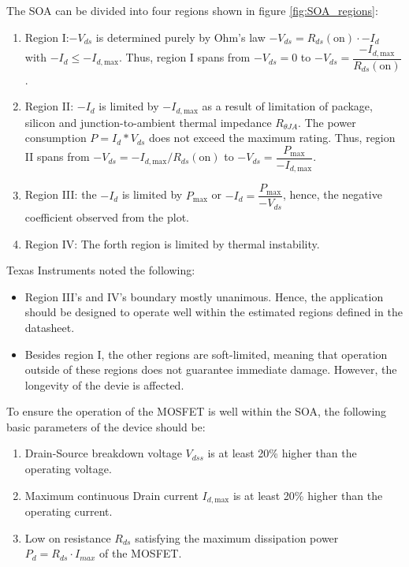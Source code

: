 \documentclass[../main.tex]{subfiles}
\begin{document}
    \justify
    The SOA can be divided into four regions shown in figure \ref{fig:SOA_regions}:
    \begin{enumerate}
        \item Region I:$-V_{ds}$ is determined purely by Ohm's law  $-V_{ds} = R_{ds}(\text{on})\cdot -I_d$ with $-I_d \leq -I_{d,\text{max}}$. Thus, region I spans from $-V_{ds} = 0$ to $-V_{ds} = \dfrac{-I_{d,\text{max}}}{R_{ds}(\text{on})}$.
        \item Region II: $-I_{d}$ is limited by $-I_{d,\text{max}}$ as a result of limitation of package, silicon and junction-to-ambient thermal impedance $R_{\theta J A}$. The power consumption $P=I_{d} * V_{ds}$ does not exceed the maximum rating. Thus, region II spans from $-V_{ds} = -I_{d,\text{max}} / R_{ds}(\text{on})$ to $-V_{ds} = \dfrac{P_\text{max}}{-I_{d,\text{max}}}$.
        \item Region III: the $-I_{d}$ is limited by $P_\text{max}$ or $-I_d = \dfrac{P_\text{max}}{-V_{ds}}$, hence, the negative coefficient observed from the plot.
        \item Region IV: The forth region is limited by thermal instability. 
    \end{enumerate}

    \justify
    Texas Instruments \cite{TISOA} noted the following:
    \begin{itemize}
        \item Region III's and IV's boundary mostly unanimous. Hence, the application should be designed to operate well within the estimated regions defined in the datasheet. 
        \item Besides region I, the other regions are soft-limited, meaning that operation outside of these regions does not guarantee immediate damage. However, the longevity of the devie is affected.
    \end{itemize}

    \justify
    To ensure the operation of the MOSFET is well within the SOA, the following basic parameters of the device should be:

    \begin{enumerate}
        \item Drain-Source breakdown voltage $V_{dss}$ is at least 20\% higher than the operating voltage. 
        \item Maximum continuous Drain current $I_{d,\text{max}}$ is at least 20\% higher than the operating current.
        \item Low on resistance $R_{ds}$ satisfying the maximum dissipation power $P_{d}=R_{ds} \cdot I_{max}$ of the MOSFET.
    \end{enumerate}
\end{document}
